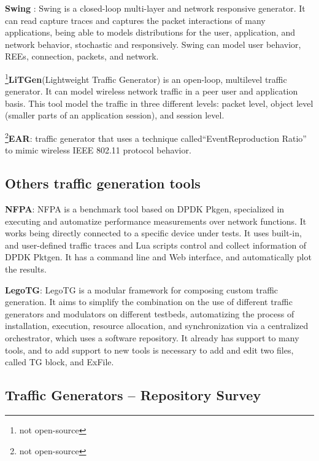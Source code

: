 \textbf{Swing}\cite{swing-paper} \cite{web-swing}: Swing is a closed-loop multi-layer and network responsive generator. It can read capture traces and captures the packet interactions of many applications, being able to models distributions for the user, application, and network behavior, stochastic and responsively. Swing can model user behavior, REEs, connection, packets, and network. 

\footnote{not open-source}\textbf{LiTGen}(Lightweight Traffic Generator)\cite{litgen-paper} is an open-loop, multilevel traffic generator. It can model wireless network traffic in a peer user and application basis. This tool model the traffic in three different levels: packet level, object level (smaller parts of an application session), and session level.


\footnote{not open-source}\textbf{EAR}\cite{ear-paper}: traffic generator that uses a technique called“EventReproduction Ratio” to mimic wireless IEEE 802.11 protocol behavior. 



\subsection{Others traffic generation tools}


\textbf{NFPA}\cite{nfpa-paper}:  NFPA is a benchmark tool based on DPDK Pkgen, specialized in executing and automatize performance measurements over network functions. It works being directly connected to a specific device under tests. It uses built-in, and user-defined traffic traces and Lua scripts control and collect information of DPDK Pktgen. It has a command line and Web interface, and automatically plot the results. 

\textbf{LegoTG}\cite{legotg-paper}:  LegoTG is a modular framework for composing custom traffic generation. It aims to simplify the combination on the use of different traffic generators and modulators on different testbeds, automatizing the process of installation, execution, resource allocation, and synchronization via a centralized orchestrator, which uses a software repository. It already has support to many tools, and to add support to new tools is necessary to add and edit two files, called TG block, and ExFile.


\subsection{Traffic Generators -- Repository Survey}

